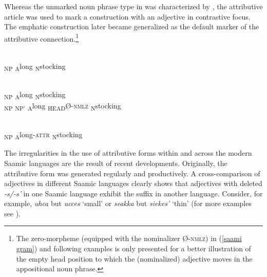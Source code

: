 {\largerpage
Whereas the unmarked noun phrase type in  was characterized by , the attributive article was used to mark a construction with an adjective in contrastive focus. The emphatic construction later became generalized as the default marker of the attributive connection.\footnote{The zero-morpheme (equipped with the nominalizer Ø-\textsc{nmlz}) in (\ref{saami gram}) and following examples is only presented for a better illustration of the empty head position to which the (nominalized) adjective moves in the appositional noun phrase.}
\begin{exe}
\label{saami gram}
\begin{xlist}
\begin{xlist}
\\
	{\ob}\textsubscript{\upshape NP} \textsubscript{\upshape A}long \textsubscript{\upshape N}stocking{\cb}
\end{xlist}
\begin{xlist}
\\
	{\ob}\textsubscript{\upshape NP} \textsubscript{\upshape A}long \textsubscript{\upshape N}stocking{\cb}
\\
	{\ob}\textsubscript{\upshape NP} {\ob}\textsubscript{\upshape NP'} \textsubscript{\upshape A}long \textsubscript{\upshape HEAD}{\rm Ø-\textsc{nmlz}}{\cb} \textsubscript{\upshape N}stocking{\cb}
\end{xlist}
\begin{xlist}
\\
	{\ob}\textsubscript{\upshape NP} \textsubscript{\upshape A}long{\rm -\textsc{attr}} \textsubscript{\upshape N}stocking{\cb}
\end{xlist}
\end{xlist}
\end{exe}

The irregularities in the use of attributive forms within and across the modern Saamic languages are the result of recent developments. Originally, the attributive form was generated regularly and productively. A cross-comparison of adjectives in different Saamic languages clearly shows that adjectives with deleted \textit{-s/-s'} in one Saamic language exhibit the suffix in another language. Consider, for example,  \textit{uhca} but  \textit{ucces} ‘small’ or  \textit{seakka} but  \textit{sie{\ng}{\ng}kes'} ‘thin’ (for more examples see \citealt{riesler2006b}).

}
